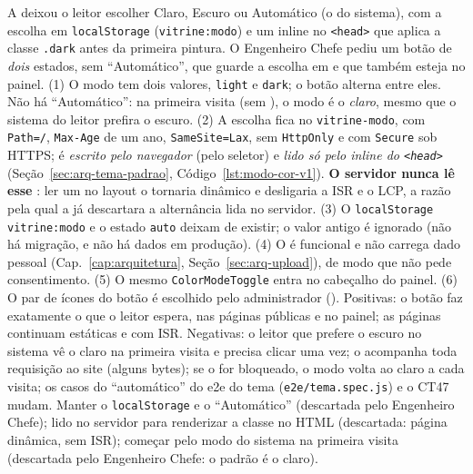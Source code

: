 {A  deixou o leitor escolher Claro, Escuro ou Automático (o do sistema), com a escolha em \texttt{localStorage} (\texttt{vitrine:modo}) e um  inline no \texttt{<head>} que aplica a classe \texttt{.dark} antes da primeira pintura. O Engenheiro Chefe pediu um botão de \emph{dois} estados, sem ``Automático'', que guarde a escolha em  e que também esteja no painel.}
{(1) O modo tem dois valores, \texttt{light} e \texttt{dark}; o botão alterna entre eles. Não há ``Automático'': na primeira visita (sem ), o modo é o \emph{claro}, mesmo que o sistema do leitor prefira o escuro. (2) A escolha fica no  \texttt{vitrine-modo}, com \texttt{Path=/}, \texttt{Max-Age} de um ano, \texttt{SameSite=Lax}, sem \texttt{HttpOnly} e com \texttt{Secure} sob HTTPS; é \emph{escrito pelo navegador} (pelo seletor) e \emph{lido só pelo  inline do \texttt{<head>}} (Seção~\ref{sec:arq-tema-padrao}, Código~\ref{lst:modo-cor-v1}). \textbf{O servidor nunca lê esse }: ler um  no layout o tornaria dinâmico e desligaria a ISR e o LCP, a razão pela qual a  já descartara a alternância lida no servidor. (3) O \texttt{localStorage} \texttt{vitrine:modo} e o estado \texttt{auto} deixam de existir; o valor antigo é ignorado (não há migração, e não há dados em produção). (4) O  é funcional e não carrega dado pessoal (Cap.~\ref{cap:arquitetura}, Seção~\ref{sec:arq-upload}), de modo que não pede consentimento. (5) O mesmo \texttt{ColorModeToggle} entra no cabeçalho do painel. (6) O par de ícones do botão é escolhido pelo administrador ().}
{Positivas: o botão faz exatamente o que o leitor espera, nas páginas públicas e no painel; as páginas continuam estáticas e com ISR. Negativas: o leitor que prefere o escuro no sistema vê o claro na primeira visita e precisa clicar uma vez; o  acompanha toda requisição ao site (alguns bytes); se o  for bloqueado, o modo volta ao claro a cada visita; os casos do ``automático'' do e2e do tema (\texttt{e2e/tema.spec.js}) e o CT47 mudam.}
{Manter o \texttt{localStorage} e o ``Automático'' (descartada pelo Engenheiro Chefe);  lido no servidor para renderizar a classe no HTML (descartada: página dinâmica, sem ISR); começar pelo modo do sistema na primeira visita (descartada pelo Engenheiro Chefe: o padrão é o claro).}

